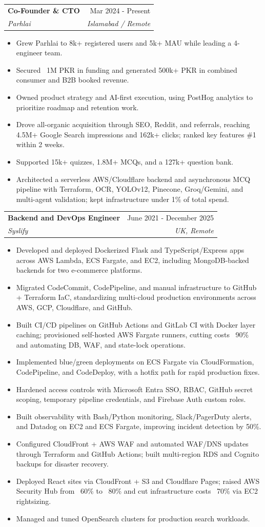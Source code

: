 \documentclass[letterpaper,10pt]{article}
\makeatletter
\newcommand{\resumeItem}[1]{
  \item\small{{#1 \vspace{-3pt}}}
}
\newcommand{\resumeSubheading}[4]{
  \vspace{-4pt}\item
  \begin{tabular*}{0.97\textwidth}[t]{l@{\extracolsep{\fill}}r}
    \small\textbf{#1} & #2 \\
    \textit{\small#3} & \textit{\small #4} \\
  \end{tabular*}\vspace{-7pt}
}
\newcommand{\resumeItemListStart}{\begin{itemize}}
\newcommand{\resumeItemListEnd}{\end{itemize}\vspace{-7pt}}
\makeatother
\begin{document}
\resumeSubheading
{Co-Founder \& CTO}{Mar 2024 - Present}
{Parhlai}{Islamabad / Remote}
\resumeItemListStart
\resumeItem{Grew Parhlai to 8k+ registered users and 5k+ MAU while leading a 4-engineer team.}
\resumeItem{Secured ~1M PKR in funding and generated 500k+ PKR in combined consumer and B2B booked revenue.}
\resumeItem{Owned product strategy and AI-first execution, using PostHog analytics to prioritize roadmap and retention work.}
\resumeItem{Drove all-organic acquisition through SEO, Reddit, and referrals, reaching 4.5M+ Google Search impressions and 162k+ clicks; ranked key features \#1 within 2 weeks.}
\resumeItem{Supported 15k+ quizzes, 1.8M+ MCQs, and a 127k+ question bank.}
\resumeItem{Architected a serverless AWS/Cloudflare backend and asynchronous MCQ pipeline with Terraform, OCR, YOLOv12, Pinecone, Groq/Gemini, and multi-agent validation; kept infrastructure under 1\% of total spend.}
\resumeItemListEnd


\resumeSubheading
{Backend and DevOps Engineer}{June 2021 - December 2025}
{Syslify}{UK, Remote}
\resumeItemListStart
\resumeItem{Developed and deployed Dockerized Flask and TypeScript/Express apps across AWS Lambda, ECS Fargate, and EC2, including MongoDB-backed backends for two e-commerce platforms.}
\resumeItem{Migrated CodeCommit, CodePipeline, and manual infrastructure to GitHub + Terraform IaC, standardizing multi-cloud production environments across AWS, GCP, Cloudflare, and GitHub.}
\resumeItem{Built CI/CD pipelines on GitHub Actions and GitLab CI with Docker layer caching; provisioned self-hosted AWS Fargate runners, cutting costs ~90\% and automating DB, WAF, and state-lock operations.}
\resumeItem{Implemented blue/green deployments on ECS Fargate via CloudFormation, CodePipeline, and CodeDeploy, with a hotfix path for rapid production fixes.}
\resumeItem{Hardened access controls with Microsoft Entra SSO, RBAC, GitHub secret scoping, temporary pipeline credentials, and Firebase Auth custom roles.}
\resumeItem{Built observability with Bash/Python monitoring, Slack/PagerDuty alerts, and Datadog on EC2 and ECS Fargate, improving incident detection by 50\%.}
\resumeItem{Configured CloudFront + AWS WAF and automated WAF/DNS updates through Terraform and GitHub Actions; built multi-region RDS and Cognito backups for disaster recovery.}
\resumeItem{Deployed React sites via CloudFront + S3 and Cloudflare Pages; raised AWS Security Hub from ~60\% to ~80\% and cut infrastructure costs ~70\% via EC2 rightsizing.}
\resumeItem{Managed and tuned OpenSearch clusters for production search workloads.}
\resumeItemListEnd
\end{document}
